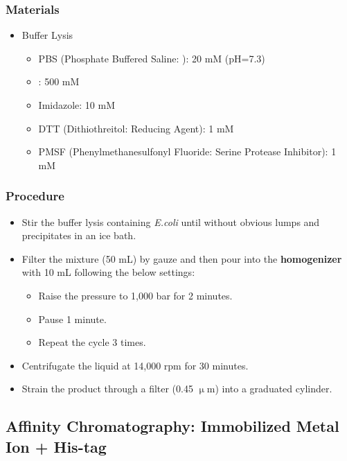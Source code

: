 \documentclass{report}
\begin{document}
\subsubsection{Materials}
\begin{itemize}
    \item Buffer Lysis
    \begin{itemize}
        \item PBS (Phosphate Buffered Saline: ): 20 mM (pH=7.3)
        \item {}: 500 mM
        \item Imidazole: 10 mM
        \item DTT (Dithiothreitol: Reducing Agent): 1 mM
        \item PMSF (Phenylmethanesulfonyl Fluoride: Serine Protease Inhibitor): 1 mM
    \end{itemize}
\end{itemize}
\subsubsection{Procedure}
\begin{itemize}
    \item Stir the buffer lysis containing \textit{E.coli} until without obvious lumps and precipitates in an ice bath.
    \item Filter the mixture (50 mL) by gauze and then pour into the \textbf{homogenizer} with 10 mL  following the below settings:
    \begin{itemize}
        \item Raise the pressure to 1,000 bar for 2 minutes.
        \item Pause 1 minute.
        \item Repeat the cycle 3 times.
    \end{itemize}
    \item Centrifugate the liquid at 14,000 rpm for 30 minutes.
    \item Strain the product through a filter (0.45 $\upmu$m) into a graduated cylinder.
\end{itemize}
\subsection{Affinity Chromatography: Immobilized  Metal Ion + His-tag}
\end{document}
